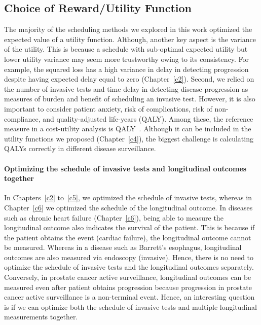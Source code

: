 \subsection{Choice of Reward/Utility Function}
The majority of the scheduling methods we explored in this work optimized the expected value of a utility function. Although, another key aspect is the variance of the utility. This is because a schedule with sub-optimal expected utility but lower utility variance may seem more trustworthy owing to its consistency. For example, the squared loss has a high variance in delay in detecting progression despite having expected delay equal to zero (Chapter~\ref{c2}). Second, we relied on the number of invasive tests and time delay in detecting disease progression as measures of burden and benefit of scheduling an invasive test. However, it is also important to consider patient anxiety, risk of complications, risk of non-compliance, and quality-adjusted life-years (QALY). Among these, the reference measure in a cost-utility analysis is QALY~\citep{sassi2006calculating}. Although it can be included in the utility functions we proposed (Chapter~\ref{c4}), the biggest challenge is calculating QALYs correctly in different disease surveillance.

\paragraph{Optimizing the schedule of invasive tests and longitudinal outcomes together} In Chapters~\ref{c2} to~\ref{c5}, we optimized the schedule of invasive tests, whereas in Chapter~\ref{c6} we optimized the schedule of the longitudinal outcome. In diseases such as chronic heart failure (Chapter~\ref{c6}), being able to measure the longitudinal outcome also indicates the survival of the patient. This is because if the patient obtains the event (cardiac failure), the longitudinal outcome cannot be measured. Whereas in a disease such as Barrett's esophagus, longitudinal outcomes are also measured via endoscopy (invasive). Hence, there is no need to optimize the schedule of invasive tests and the longitudinal outcomes separately. Conversely, in prostate cancer active surveillance, longitudinal outcomes can be measured even after patient obtains progression because progression in prostate cancer active surveillance is a non-terminal event. Hence, an interesting question is if we can optimize both the schedule of invasive tests and multiple longitudinal measurements together. 

